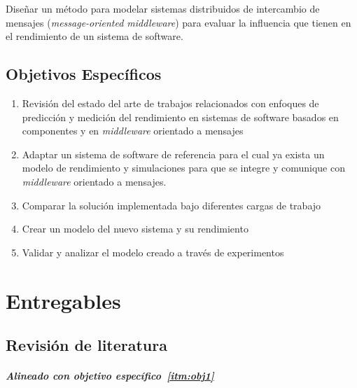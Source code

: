 \documentclass[11pt, twoside]{report}
\begin{document}
Diseñar un método para modelar sistemas distribuidos de intercambio de mensajes (\emph{message-oriented middleware}) para evaluar la influencia que tienen en el rendimiento de un sistema de software.

\section{Objetivos Específicos}
\begin{enumerate}
    \item \label{itm:obj1}Revisión del estado del arte de trabajos relacionados con enfoques de predicción y medición del rendimiento en sistemas de software basados en componentes y en \emph{middleware} orientado a mensajes
    \item \label{itm:obj2}Adaptar un sistema de software de referencia para el cual ya exista un modelo de rendimiento y simulaciones para que se integre y comunique con \emph{middleware} orientado a mensajes.
    \item \label{itm:obj3}Comparar la solución implementada bajo diferentes cargas de trabajo
    \item \label{itm:obj4}Crear un modelo del nuevo sistema y su rendimiento 
    \item \label{itm:obj5}Validar y analizar el modelo creado a través de experimentos
\end{enumerate}

\chapter{Entregables}

\section{Revisión de literatura}
\paragraph{Alineado con objetivo específico~\ref{itm:obj1}}
\end{document}

